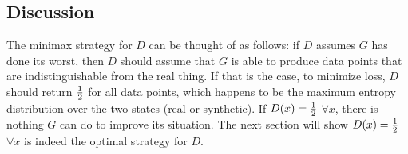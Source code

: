 \subsection{Discussion}

The minimax strategy for $D$ can be thought of as follows: if $D$ assumes $G$
has done its worst, then $D$ should assume that $G$ is able to produce data
points that are indistinguishable from the real thing. If that is the case, to
minimize loss, $D$ should return ${1 \over 2}$ for all data points, which
happens to be the maximum entropy distribution over the two states (real or
synthetic). If $D(x) = {1 \over 2}$ $\forall x$, there is nothing $G$ can do to
improve its situation. The next section will show $D(x) = {1 \over 2}$ $\forall
x$ is indeed the optimal strategy for $D$.


